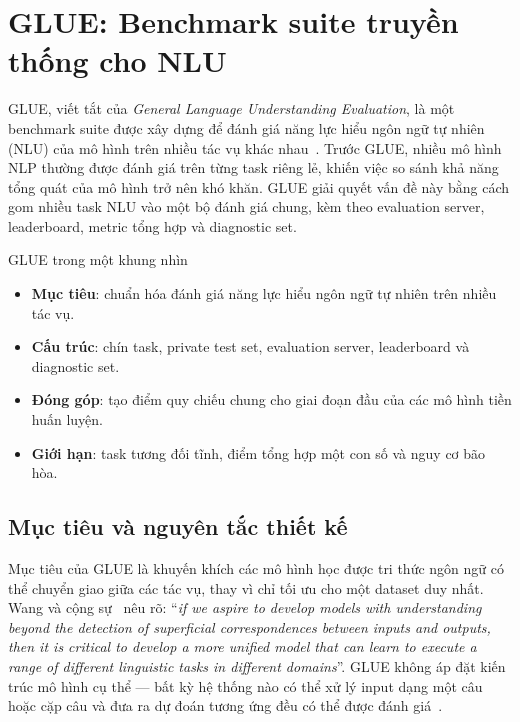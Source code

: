 
\section{GLUE: Benchmark suite truyền thống cho NLU}
\label{sec:glue}

GLUE, viết tắt của \textit{General Language Understanding Evaluation}, là một benchmark suite được xây dựng để đánh giá năng lực hiểu ngôn ngữ tự nhiên (NLU) của mô hình trên nhiều tác vụ khác nhau~\cite{glue}. Trước GLUE, nhiều mô hình NLP thường được đánh giá trên từng task riêng lẻ, khiến việc so sánh khả năng tổng quát của mô hình trở nên khó khăn. GLUE giải quyết vấn đề này bằng cách gom nhiều task NLU vào một bộ đánh giá chung, kèm theo evaluation server, leaderboard, metric tổng hợp và diagnostic set.

\begin{summarybox}{GLUE trong một khung nhìn}
\begin{itemize}
    \item \textbf{Mục tiêu}: chuẩn hóa đánh giá năng lực hiểu ngôn ngữ tự nhiên trên nhiều tác vụ.
    \item \textbf{Cấu trúc}: chín task, private test set, evaluation server, leaderboard và diagnostic set.
    \item \textbf{Đóng góp}: tạo điểm quy chiếu chung cho giai đoạn đầu của các mô hình tiền huấn luyện.
    \item \textbf{Giới hạn}: task tương đối tĩnh, điểm tổng hợp một con số và nguy cơ bão hòa.
\end{itemize}
\end{summarybox}

\subsection{Mục tiêu và nguyên tắc thiết kế}

Mục tiêu của GLUE là khuyến khích các mô hình học được tri thức ngôn ngữ có thể chuyển giao giữa các tác vụ, thay vì chỉ tối ưu cho một dataset duy nhất. Wang và cộng sự~\cite{glue} nêu rõ: ``\textit{if we aspire to develop models with understanding beyond the detection of superficial correspondences between inputs and outputs, then it is critical to develop a more unified model that can learn to execute a range of different linguistic tasks in different domains}''. GLUE không áp đặt kiến trúc mô hình cụ thể --- bất kỳ hệ thống nào có thể xử lý input dạng một câu hoặc cặp câu và đưa ra dự đoán tương ứng đều có thể được đánh giá~\cite{glue}.

